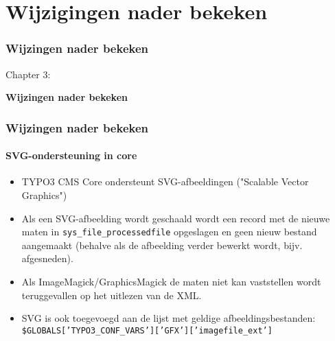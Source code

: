 %

\section{Wijzigingen nader bekeken}
\begin{frame}[fragile]
	\frametitle{Wijzingen nader bekeken}

	\begin{center}\huge{Chapter 3:}\end{center}
	\begin{center}\huge{\color{typo3darkgrey}\textbf{Wijzingen nader bekeken}}\end{center}

\end{frame}

\begin{frame}[fragile]
	\frametitle{Wijzingen nader bekeken}
	\framesubtitle{SVG-ondersteuning in core}

	\begin{itemize}
		\item TYPO3 CMS Core ondersteunt SVG-afbeeldingen ("Scalable Vector Graphics")

		\item Als een SVG-afbeelding wordt geschaald wordt een record met de nieuwe maten in
			\texttt{sys\_file\_processedfile} opgeslagen en geen nieuw bestand aangemaakt\newline
			\small(behalve als de afbeelding verder bewerkt wordt, bijv. afgesneden)\normalsize.

		\item Als ImageMagick/GraphicsMagick de maten niet kan vaststellen wordt teruggevallen
			op het uitlezen van de XML.

		\item SVG is ook toegevoegd aan de lijst met geldige afbeeldingsbestanden:\newline
			\texttt{\$GLOBALS['TYPO3\_CONF\_VARS']['GFX']['imagefile\_ext']}

	\end{itemize}

\end{frame}

